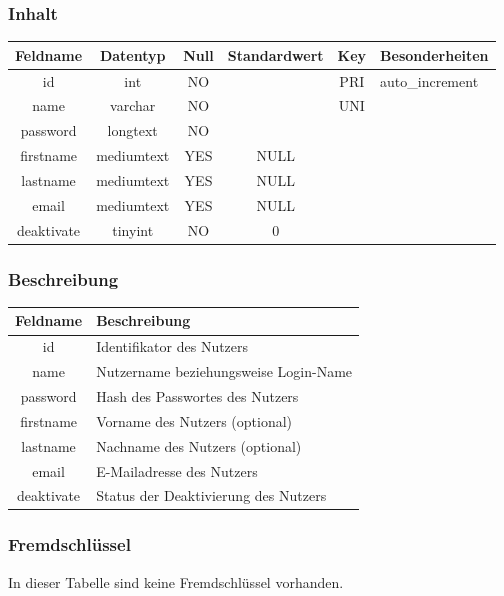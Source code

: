 \subsubsection{Inhalt}
\begin{table}[H]
	\begin{tabular}{|c|c|c|c|c|p{3.5cm}|}
		\hline
		\textbf{Feldname} & \textbf{Datentyp} & \textbf{Null} & \textbf{Standardwert} & \textbf{Key}   & \textbf{Besonderheiten} \\ \hline
		id & int & NO &  & PRI & auto\_increment \\ \hline
		name & varchar & NO &  & UNI & \\ \hline
		password & longtext & NO &  &  & \\ \hline
		firstname & mediumtext & YES & NULL &  & \\ \hline
		lastname & mediumtext & YES & NULL &  & \\ \hline
		email & mediumtext & YES & NULL &  & \\ \hline
		deaktivate & tinyint & NO & 0 &  & \\ \hline
	\end{tabular}
\end{table}
\subsubsection{Beschreibung}
\begin{table}[H]
	\begin{tabular}{|c|p{12cm}|}
		\hline
		\textbf{Feldname} & \textbf{Beschreibung} \\ \hline
		id & Identifikator des Nutzers \\ \hline
		name & Nutzername beziehungsweise Login-Name \\ \hline
		password & Hash des Passwortes des Nutzers \\ \hline
		firstname & Vorname des Nutzers (optional) \\ \hline
		lastname & Nachname des Nutzers (optional) \\ \hline
		email & E-Mailadresse des Nutzers \\ \hline
		deaktivate & Status der Deaktivierung des Nutzers \\ \hline
	\end{tabular}
\end{table}
\subsubsection{Fremdschlüssel}
In dieser Tabelle sind keine Fremdschlüssel vorhanden.
